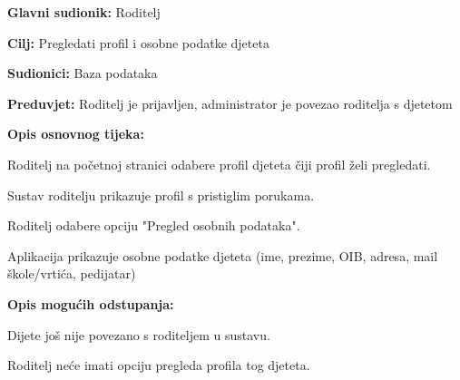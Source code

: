 					\noindent {}
					\begin{packed_item}
						
						\item \textbf{Glavni sudionik: }Roditelj
						\item  \textbf{Cilj:} Pregledati profil i osobne podatke djeteta
						\item  \textbf{Sudionici:} Baza podataka
						\item  \textbf{Preduvjet:} Roditelj je prijavljen, administrator je povezao roditelja s djetetom
						\item  \textbf{Opis osnovnog tijeka:}
						
						\item[] \begin{packed_enum}
							
							\item Roditelj na početnoj stranici odabere profil djeteta čiji profil želi pregledati. 
							\item Sustav roditelju prikazuje profil s pristiglim porukama.
							\item Roditelj odabere opciju "Pregled osobnih podataka".
							\item Aplikacija prikazuje osobne podatke djeteta (ime, prezime, OIB, adresa, mail škole/vrtića, pedijatar)
						\end{packed_enum}
						
						\item  \textbf{Opis mogućih odstupanja:}
						
						\item[] \begin{packed_item}
							
							\item[1.a] Dijete još nije povezano s roditeljem u sustavu.
							\item[] \begin{packed_enum}
								
								\item Roditelj neće imati opciju pregleda profila tog djeteta.
								
								
							\end{packed_enum}
						
							
						\end{packed_item}
					\end{packed_item}
					
